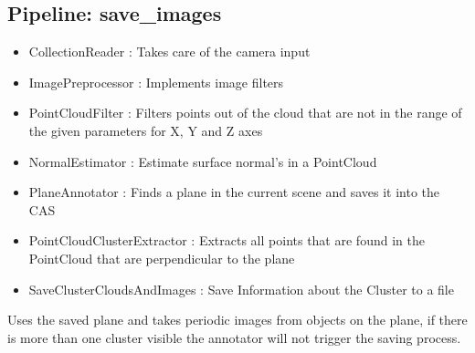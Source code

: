 \documentclass[main.tex]{subfiles}
\begin{document}
			\subsection{Pipeline: save\_images}
\begin{itemize}
	\item CollectionReader : Takes care of the camera input
	\item ImagePreprocessor : Implements image filters  
	\item PointCloudFilter : Filters points out of the cloud that are not in the range of the given parameters for X, Y and Z axes
	\item NormalEstimator : Estimate surface normal's in a PointCloud 
	\item PlaneAnnotator : Finds a plane in the current scene and saves it into the CAS
	\item PointCloudClusterExtractor : Extracts all points that are found in the PointCloud that are perpendicular to the plane 
	\item SaveClusterCloudsAndImages : Save Information about the Cluster to a file 
\end{itemize}
Uses the saved plane and takes periodic images from objects on the plane, if there is more than one cluster visible the annotator will not trigger the saving process.
\end{document}

